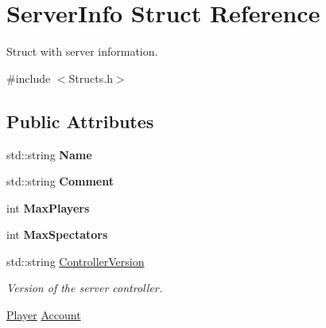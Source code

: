 \hypertarget{structServerInfo}{\section{Server\-Info Struct Reference}
\label{structServerInfo}
}


Struct with server information.  




{\ttfamily \#include $<$Structs.\-h$>$}

\subsection*{Public Attributes}
\begin{DoxyCompactItemize}
\item 
\hypertarget{structServerInfo_a43d5f6ee5b5e1886161cea865ac9f590}{std\-::string {\bfseries Name}}\label{structServerInfo_a43d5f6ee5b5e1886161cea865ac9f590}

\item 
\hypertarget{structServerInfo_a82d5babd55b867eca9f58e5ed32857c1}{std\-::string {\bfseries Comment}}\label{structServerInfo_a82d5babd55b867eca9f58e5ed32857c1}

\item 
\hypertarget{structServerInfo_a43e90d8209ae6481ded2f6974aa5b15a}{int {\bfseries Max\-Players}}\label{structServerInfo_a43e90d8209ae6481ded2f6974aa5b15a}

\item 
\hypertarget{structServerInfo_a4e766753bc57c2d13d5bd3a007707178}{int {\bfseries Max\-Spectators}}\label{structServerInfo_a4e766753bc57c2d13d5bd3a007707178}

\item 
\hypertarget{structServerInfo_af708f8b3545fe87a6c86bbcebf14dc34}{std\-::string \hyperlink{structServerInfo_af708f8b3545fe87a6c86bbcebf14dc34}{Controller\-Version}}\label{structServerInfo_af708f8b3545fe87a6c86bbcebf14dc34}

\begin{DoxyCompactList}\small\item\em Version of the server controller. \end{DoxyCompactList}\item 
\hypertarget{structServerInfo_a4ce1342cad06ef64048b368ce0dec575}{\hyperlink{structPlayer}{Player} \hyperlink{structServerInfo_a4ce1342cad06ef64048b368ce0dec575}{Account}}\label{structServerInfo_a4ce1342cad06ef64048b368ce0dec575}


\end{DoxyCompactItemize}
